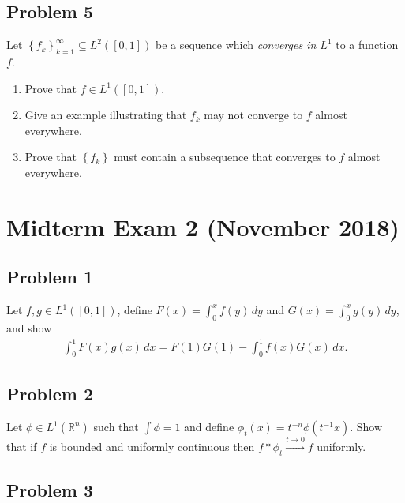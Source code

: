 \hypertarget{problem-5}{%
\subsection{Problem 5}\label{problem-5}}

Let \(\left\{{ f_k }\right\}_{k=1}^{\infty } \subseteq L^2([0, 1])\) be
a sequence which \emph{converges in \(L^1\)} to a function \(f\).

\begin{enumerate}
\def\labelenumi{\alph{enumi}.}
\item
  Prove that \(f\in L^1([0, 1])\).
\item
  Give an example illustrating that \(f_k\) may not converge to \(f\)
  almost everywhere.
\item
  Prove that \(\left\{{f_k}\right\}\) must contain a subsequence that
  converges to \(f\) almost everywhere.
\end{enumerate}

\hypertarget{midterm-exam-2-november-2018}{%
\section{Midterm Exam 2 (November
2018)}\label{midterm-exam-2-november-2018}}

\hypertarget{problem-1-1}{%
\subsection{Problem 1}\label{problem-1-1}}

Let \(f, g\in L^1([0, 1])\), define \(F(x) = \int_0^x f(y)\,dy\) and
\(G(x) = \int_0^x g(y)\,dy\), and show
\begin{align*}
\int_0^1 F(x)g(x) \,dx = F(1)G(1) - \int_0^1 f(x) G(x) \, dx
.\end{align*}

\hypertarget{problem-2-1}{%
\subsection{Problem 2}\label{problem-2-1}}

Let \(\phi\in L^1({\mathbb{R}}^n)\) such that \(\int \phi = 1\) and
define \(\phi_t(x) = t^{-n}\phi(t^{-1}x)\). Show that if \(f\) is
bounded and uniformly continuous then
\(f\ast \phi_t \overset{t\to 0}\to f\) uniformly.

\hypertarget{problem-3-1}{%
\subsection{Problem 3}\label{problem-3-1}}

